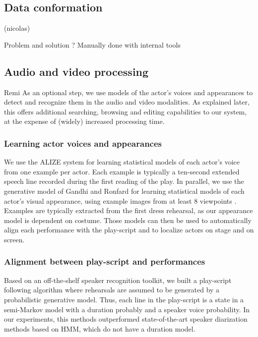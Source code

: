 \documentclass[conference]{IEEEtran}
\begin{document}
\subsection{Data conformation} (nicolas)

Problem and solution ? Manually done with internal tools

\subsection{Audio and video processing} Remi
As an optional step, we use models of  the actor's voices and appearances to detect and recognize them
in the audio and video modalities. As explained later, this offers additional searching, browsing and editing capabilities
to our system, at the expense of (widely) increased processing time.

\subsubsection{Learning actor  voices and appearances}
We use the ALIZE system for learning statistical models of each actor's voice \cite{Bonastre05}  from one example per actor.
Each example is typically a ten-second extended speech line recorded during the first reading of the play. In parallel,
we use the generative model of Gandhi and Ronfard \cite{Gandhi13} for learning statistical models of each actor's visual appearance, 
using example images from at least 8 viewpoints . Examples are typically extracted from the first dress rehearsal,
as our appearance model is dependent on costume.  Those models can then be used to automatically align
each performance with the play-script and to localize actors on stage and on screen. 

\subsubsection{Alignment between play-script and performances}

Based on an off-the-shelf speaker recognition toolkit, we built a play-script following algorithm where rehearsals 
are assumed to be generated by a probabilistic generative model.  Thus, each  line in the play-script is a state 
in a semi-Markov model with a duration probably and a speaker voice probability. In our experiments, this methods
outperformed state-of-the-art speaker diarization methods based on HMM, which do not have a duration model.

\end{document}
